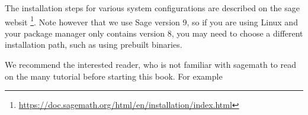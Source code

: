 The installation steps for various system configurations are described on the sage websit \footnote{\url{https://doc.sagemath.org/html/en/installation/index.html}}. Note however that we use Sage version 9, so if you are using Linux and your package manager only contains version 8, you may need to choose a different installation path, such as using prebuilt binaries.

We recommend the interested reader, who is not familiar with sagemath to read on the many tutorial before starting this book. For example 




